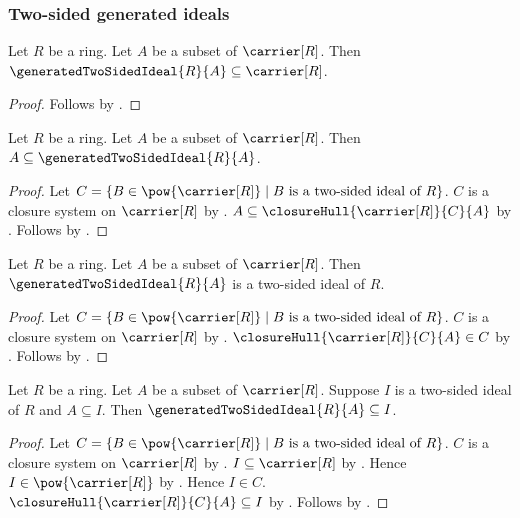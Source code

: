 \subsubsection{Two-sided generated ideals}

\begin{proposition}\label{generated_two_sided_ideal_subseteq_carrier}
    Let $R$ be a ring.
    Let $A$ be a subset of $\carrier[R]$.
    Then $\generatedTwoSidedIdeal{R}{A}\subseteq\carrier[R]$.
\end{proposition}
\begin{proof}
    Follows by
        .
\end{proof}

\begin{proposition}\label{generated_two_sided_ideal_contains_generators}
    Let $R$ be a ring.
    Let $A$ be a subset of $\carrier[R]$.
    Then $A\subseteq\generatedTwoSidedIdeal{R}{A}$.
\end{proposition}
\begin{proof}
    Let
        $C=\{B\in\pow{\carrier[R]}\mid
            \text{$B$ is a two-sided ideal of $R$}\}$.
    $C$ is a closure system on $\carrier[R]$ by
        .
    $A\subseteq\closureHull{\carrier[R]}{C}{A}$ by
        .
    Follows by .
\end{proof}

\begin{theorem}\label{generated_two_sided_ideal_is_two_sided_ideal}
    Let $R$ be a ring.
    Let $A$ be a subset of $\carrier[R]$.
    Then $\generatedTwoSidedIdeal{R}{A}$ is a two-sided ideal of $R$.
\end{theorem}
\begin{proof}
    Let
        $C=\{B\in\pow{\carrier[R]}\mid
            \text{$B$ is a two-sided ideal of $R$}\}$.
    $C$ is a closure system on $\carrier[R]$ by
        .
    $\closureHull{\carrier[R]}{C}{A}\in C$ by
        .
    Follows by .
\end{proof}

\begin{theorem}\label{generated_two_sided_ideal_least}
    Let $R$ be a ring.
    Let $A$ be a subset of $\carrier[R]$.
    Suppose $I$ is a two-sided ideal of $R$ and $A\subseteq I$.
    Then $\generatedTwoSidedIdeal{R}{A}\subseteq I$.
\end{theorem}
\begin{proof}
    Let
        $C=\{B\in\pow{\carrier[R]}\mid
            \text{$B$ is a two-sided ideal of $R$}\}$.
    $C$ is a closure system on $\carrier[R]$ by
        .
    $I\subseteq\carrier[R]$ by
        .
    Hence $I\in\pow{\carrier[R]}$ by .
    Hence $I\in C$.
    $\closureHull{\carrier[R]}{C}{A}\subseteq I$ by
        .
    Follows by .
\end{proof}


